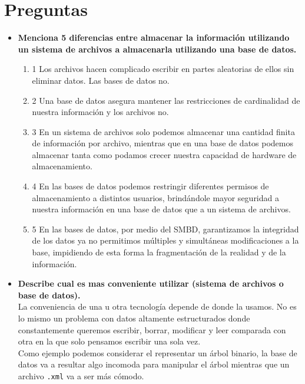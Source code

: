 \documentclass[12pt,a4paper]{article}
\begin{document}
\section{Preguntas}
\begin{itemize}
	\item \textbf{Menciona 5 diferencias entre almacenar la información
		utilizando un sistema de archivos a almacenarla utilizando una base de datos.}\\
		\begin{enumerate}
			\item 1 Los archivos hacen complicado escribir en partes aleatorias de ellos
				sin eliminar datos. Las bases de datos no.\\

			\item 2 Una base de datos asegura mantener las restricciones de cardinalidad
				de nuestra información y los archivos no.\\

			\item 3 En un sistema de archivos solo podemos almacenar una cantidad finita 
			        de información por archivo, mientras que en una base de datos podemos 
			        almacenar tanta como podamos crecer nuestra capacidad de hardware de
			        almacenamiento. \\
				
			\item 4 En las bases de datos podemos restringir diferentes permisos de 
			        almacenamiento a distintos usuarios, brindándole mayor seguridad a nuestra 
				información en una base de datos que a un sistema de archivos. \\
				
			\item 5 En las bases de datos, por medio del SMBD, garantizamos la integridad 
				de los datos ya no permitimos múltiples y simultáneas modificaciones a la base, 
				impidiendo de esta forma la fragmentación de la realidad y de la información. \\
		\end{enumerate}


	\item \textbf{Describe cual es mas conveniente utilizar (sistema de archivos o base de datos).}\\

		La conveniencia de una u otra tecnología depende de donde la usamos.
		No es lo mismo un problema con datos altamente estructurados donde
		constantemente queremos escribir, borrar, modificar y leer comparada
		con otra en la que solo pensamos escribir una sola vez.\\

		Como ejemplo podemos considerar el representar un árbol binario, la base de
		datos va a resultar algo incomoda para manipular el árbol mientras
		que un archivo \texttt{.xml} va a ser más cómodo.\\
\end{itemize}
\end{document}
